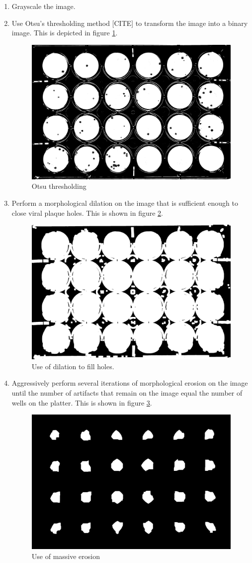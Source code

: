 \documentclass[11pt,final,twocolumn]{IEEEtran}
\begin{document}
\begin{enumerate}
\item Grayscale the image.
\item Use Otsu's thresholding method [CITE] to transform the image into a binary image. This is depicted in figure \ref{fig:segOtsu}.
\begin{figure}[H]
\centering
\includegraphics[width=.4\textwidth]{segmentOtsu.jpg}
\caption{Otsu thresholding}
\label{fig:segOtsu}
\end{figure}


\item
Perform a morphological dilation on the image that is sufficient enough to close viral plaque holes. This is shown in figure \ref{fig:segFillHoles}.
\begin{figure}[H]
\centering
\includegraphics[width=.4\textwidth]{segmentFillHoles.jpg}
\caption{Use of dilation to fill holes.}
\label{fig:segFillHoles}
\end{figure}



\item
Aggressively perform several iterations of morphological erosion on the image until the number of artifacts that remain on the image equal the number of wells on the platter. This is shown in figure \ref{fig:segErode}.
\begin{figure}[H]
\centering
\includegraphics[width=.4\textwidth]{segmentErode.jpg}
\caption{Use of massive erosion}
\label{fig:segErode}
\end{figure}



\end{enumerate}
\end{document}
